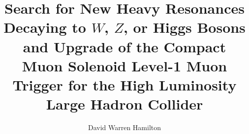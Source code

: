\documentclass[PhD]{uclathes}
\title{
  Search for New Heavy Resonances Decaying to $W$, $Z$, or Higgs Bosons and Upgrade of the Compact Muon Solenoid Level-1 Muon Trigger for the High Luminosity Large Hadron Collider
}
\author{David Warren Hamilton}
\begin{document}
\makeintropages


















\end{document}
